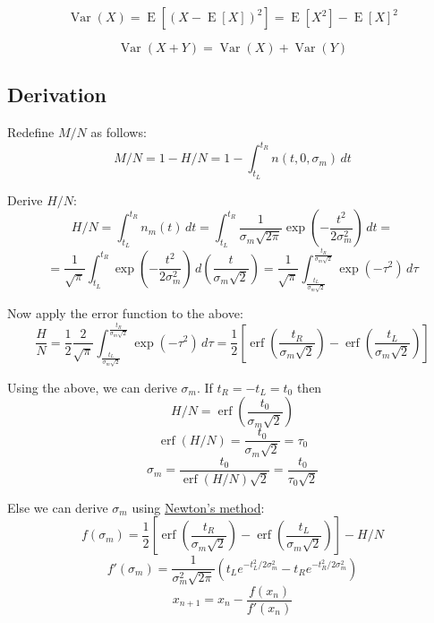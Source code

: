 \documentclass[12pt]{article}
\begin{document}
\begin{equation}
\operatorname{Var} (X) = \operatorname {E} \left[(X-\operatorname {E} [X])^{2}\right] = \operatorname {E} \left[X^{2}\right]-\operatorname {E} [X]^{2}
\label{eq:def_Variance}
\end{equation}

\begin{equation}
\operatorname {Var} (X+Y)=\operatorname {Var} (X)+\operatorname {Var} (Y)
\label{eq:def_Variance_sum}
\end{equation}

\pagebreak

\subsection*{Derivation}

Redefine \( M / N \) as follows:
\begin{equation}
M / N = 1 - H / N =
1 - \int_{t_L}^{t_R} n(t, 0, \sigma_m) \,dt
\end{equation}

Derive \( H / N \):
\[
H / N = \int_{t_L}^{t_R} n_m(t) \,dt =
\int_{t_L}^{t_R} \frac{1}{\sigma_m\sqrt{2\pi}} \exp\left(-\frac{t^2}{2\sigma_m^2} \right) \,dt =
\]
\[
= \frac{1}{\sqrt{\pi}} \int_{t_L}^{t_R} \exp\left(-\frac{t^2}{2\sigma_m^2} \right) \,d\left(\frac{t}{\sigma_m\sqrt{2}}\right) =
\frac{1}{\sqrt{\pi}} \int_{\frac{t_L}{\sigma_m\sqrt{2}}}^{\frac{t_R}{\sigma_m\sqrt{2}}} \exp\left(-\tau^2 \right) \,d\tau
\]

Now apply the error function to the above:
\[
\frac{H}{N} = \frac{1}{2}\frac{2}{\sqrt{\pi}} \int_{\frac{t_L}{\sigma_m\sqrt{2}}}^{\frac{t_R}{\sigma_m\sqrt{2}}} \exp\left(-\tau^2 \right) \,d\tau =
\frac{1}{2} \left[ \operatorname{erf}\left(\frac{t_R}{\sigma_m\sqrt{2}}\right) - \operatorname{erf}\left(\frac{t_L}{\sigma_m\sqrt{2}}\right) \right]
\]

Using the above, we can derive \(\sigma_m\).
If \(t_R = -t_L = t_0\) then
\[
H / N = \operatorname{erf}\left(\frac{t_0}{\sigma_m\sqrt{2}}\right)
\]
\[
\operatorname{erf}\left(H / N\right) = \frac{t_0}{\sigma_m\sqrt{2}} = \tau_0
\]
\[
\sigma_m = \frac{t_0}{\operatorname{erf}\left(H / N\right)\sqrt{2}} = \frac{t_0}{\tau_0\sqrt{2}}
\]

Else we can derive \(\sigma_m\) using \href{https://en.wikipedia.org/wiki/Newton%27s_method}{Newton's method}:
\[
f(\sigma_m) = \frac{1}{2} \left[
    \operatorname{erf}\left(\frac{t_R}{\sigma_m\sqrt{2}}\right) -
    \operatorname{erf}\left(\frac{t_L}{\sigma_m\sqrt{2}}\right)
\right] - H / N
\]
\[
f'(\sigma_m) = \frac{1}{\sigma_m^2\sqrt{2\pi}} \left(
    t_L e^{-t_L^2/2\sigma_m^2} -
    t_R e^{-t_R^2/2\sigma_m^2}
\right)
\]
\[
    x_{n+1}=x_{n}-{\frac {f(x_{n})}{f'(x_{n})}}
\]
\end{document}
